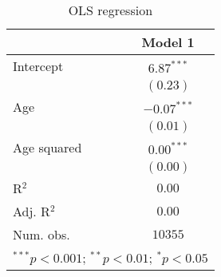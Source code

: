 
\begin{table}
\caption{OLS regression}
\begin{center}
\begin{tabular}{l c}
\hline
 & Model 1 \\
\hline
Intercept   & $6.87^{***}$  \\
            & $(0.23)$      \\
Age         & $-0.07^{***}$ \\
            & $(0.01)$      \\
Age squared & $0.00^{***}$  \\
            & $(0.00)$      \\
\hline
R$^2$       & $0.00$        \\
Adj. R$^2$  & $0.00$        \\
Num. obs.   & $10355$       \\
\hline
\multicolumn{2}{l}{\scriptsize{$^{***}p<0.001$; $^{**}p<0.01$; $^{*}p<0.05$}}
\end{tabular}
\label{table:coefficients}
\end{center}
\end{table}
